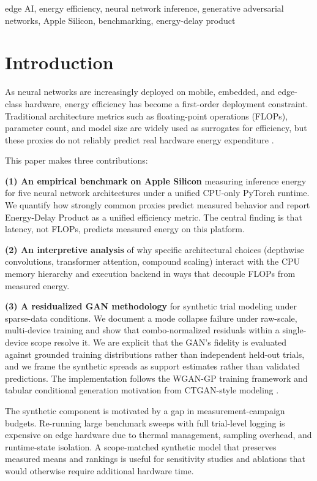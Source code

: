 \documentclass[conference]{IEEEtran}
\begin{document}
\begin{IEEEkeywords}
edge AI, energy efficiency, neural network inference, generative adversarial
networks, Apple Silicon, benchmarking, energy-delay product
\end{IEEEkeywords}

\section{Introduction}
As neural networks are increasingly deployed on mobile, embedded, and
edge-class hardware, energy efficiency has become a first-order deployment
constraint. Traditional architecture metrics such as floating-point operations
(FLOPs), parameter count, and model size are widely used as surrogates for
efficiency, but these proxies do not reliably predict real hardware energy
expenditure \cite{horowitz2014,mittal2019,hardwareaware2019,eyeriss2017}.

This paper makes three contributions:

\textbf{(1) An empirical benchmark on Apple Silicon} measuring inference
energy for five neural network architectures under a unified CPU-only PyTorch
runtime. We quantify how strongly common proxies predict measured behavior and
report Energy-Delay Product as a unified efficiency metric. The central finding
is that latency, not FLOPs, predicts measured energy on this platform.

\textbf{(2) An interpretive analysis} of why specific architectural choices
(depthwise convolutions, transformer attention, compound scaling) interact with
the CPU memory hierarchy and execution backend in ways that decouple FLOPs from
measured energy.

\textbf{(3) A residualized GAN methodology} for synthetic trial modeling under
sparse-data conditions. We document a mode collapse failure under raw-scale,
multi-device training and show that combo-normalized residuals within a
single-device scope resolve it. We are explicit that the GAN's fidelity is
evaluated against grounded training distributions rather than independent
held-out trials, and we frame the synthetic spreads as support estimates
rather than validated predictions. The implementation follows the WGAN-GP
training framework \cite{wgangp2017} and tabular conditional generation
motivation from CTGAN-style modeling \cite{ctgan2019}.

The synthetic component is motivated by a gap in measurement-campaign
budgets. Re-running large benchmark sweeps with full trial-level logging is
expensive on edge hardware due to thermal management, sampling overhead, and
runtime-state isolation. A scope-matched synthetic model that preserves
measured means and rankings is useful for sensitivity studies and ablations
that would otherwise require additional hardware time.
\end{document}
